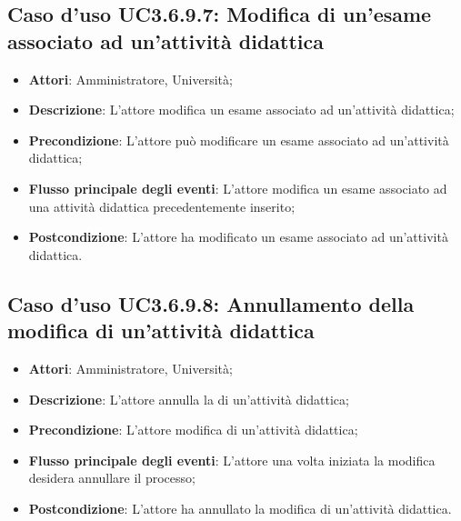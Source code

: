 \subsection{Caso d'uso \texorpdfstring{UC3.6.9.7}{UC3.6.9.7}: Modifica di un'esame associato ad un'attività didattica}
\begin{itemize}
\item \textbf{Attori}: Amministratore, Università;
\item \textbf{Descrizione}: L'attore modifica un esame associato ad un'attività didattica;

\item \textbf{Precondizione}: L'attore può modificare un esame associato ad un'attività didattica;

\item \textbf{Flusso principale degli eventi}: L'attore modifica un esame associato ad una attività didattica precedentemente inserito;

\item \textbf{Postcondizione}: L'attore ha modificato un esame associato ad un'attività didattica.

\end{itemize}
\subsection{Caso d'uso \texorpdfstring{UC3.6.9.8}{UC3.6.9.8}: Annullamento della modifica di un'attività didattica}
\begin{itemize}
\item \textbf{Attori}: Amministratore, Università;
\item \textbf{Descrizione}: L'attore annulla la di un'attività didattica;

\item \textbf{Precondizione}: L'attore modifica di un'attività didattica;

\item \textbf{Flusso principale degli eventi}: L'attore una volta iniziata la modifica desidera annullare il processo;

\item \textbf{Postcondizione}: L'attore ha annullato la modifica di un'attività didattica.

\end{itemize}

